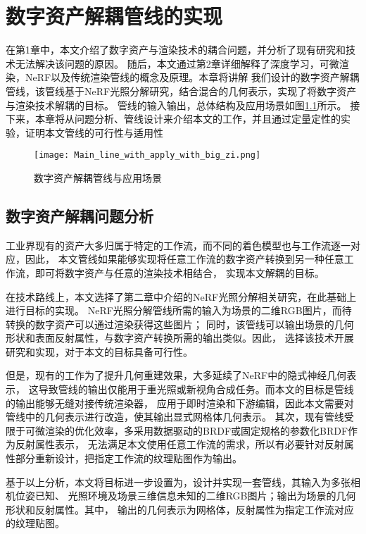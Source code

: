 
\chapter{数字资产解耦管线的实现}

在第1章中，本文介绍了数字资产与渲染技术的耦合问题，并分析了现有研究和技术无法解决该问题的原因。
随后，本文通过第2章详细解释了深度学习，可微渲染，NeRF以及传统渲染管线的概念及原理。本章将讲解
我们设计的数字资产解耦管线，该管线基于NeRF光照分解研究，结合混合的几何表示，实现了将数字资产与渲染技术解耦的目标。
管线的输入输出，总体结构及应用场景如图\ref{fig:main_pipe_line}所示。
接下来，本章将从问题分析、管线设计来介绍本文的工作，并且通过定量定性的实验，证明本文管线的可行性与适用性

\begin{figure}[htb]
  \centering
  \texttt{[image: Main\_line\_with\_apply\_with\_big\_zi.png]}
  \caption{数字资产解耦管线与应用场景}
  \label{fig:main_pipe_line}
\end{figure}

\section{数字资产解耦问题分析}

工业界现有的资产大多归属于特定的工作流，而不同的着色模型也与工作流逐一对应，因此，
本文管线如果能够实现将任意工作流的数字资产转换到另一种任意工作流，即可将数字资产与任意的渲染技术相结合，
实现本文解耦的目标。

在技术路线上，本文选择了第二章中介绍的NeRF光照分解相关研究，在此基础上进行目标的实现。
NeRF光照分解管线所需的输入为场景的二维RGB图片，而待转换的数字资产可以通过渲染获得这些图片；
同时，该管线可以输出场景的几何形状和表面反射属性，与数字资产转换所需的输出类似。因此，
选择该技术开展研究和实现，对于本文的目标具备可行性。

但是，现有的工作为了提升几何重建效果，大多延续了NeRF中的隐式神经几何表示，
这导致管线的输出仅能用于重光照或新视角合成任务。而本文的目标是管线的输出能够无缝对接传统渲染器，
应用于即时渲染和下游编辑，因此本文需要对管线中的几何表示进行改造，使其输出显式网格体几何表示。
其次，现有管线受限于可微渲染的优化效率，多采用数据驱动的BRDF或固定规格的参数化BRDF作为反射属性表示，
无法满足本文使用任意工作流的需求，所以有必要针对反射属性部分重新设计，把指定工作流的纹理贴图作为输出。

基于以上分析，本文将目标进一步设置为，设计并实现一套管线，其输入为多张相机位姿已知、
光照环境及场景三维信息未知的二维RGB图片；输出为场景的几何形状和反射属性。其中，
输出的几何表示为网格体，反射属性为指定工作流对应的纹理贴图。

